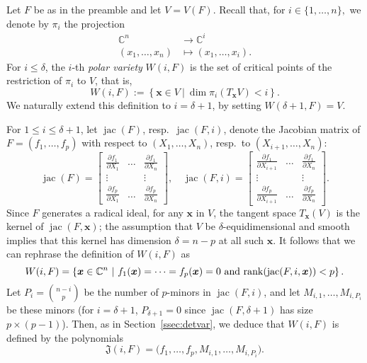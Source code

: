 \documentclass[12pt]{article}
\def\frkJ{\mathfrak{J}}
\def\xb{{\bm x}}
\DeclareMathOperator{\jac}{jac}
\def\pa{\partial}
\def\C{\mathbb{C}}
\newtheorem{lemma}[theorem]{Lemma}
\begin{document}
Let $F$ be as in the preamble and let $V=V(F)$. Recall that, for $i
\in \{1,\hdots,n\},$ we denote by $\pi_i$ the projection
\begin{align*}
  \C^n &\rightarrow \C^i \\
  (x_1,\hdots,x_n) &\mapsto  (x_1,\hdots,x_i).    
\end{align*} 
For $i \le \delta$, the $i$-th \textit{polar variety} $W(i,F)$  is
the set of critical points of the restriction of $\pi_i$ to $V$, that
is,
\[W(i,F) := \left\{\xb \in V~|~\dim \pi_i(T_\xb V) < i\right\}.\]
We naturally extend this definition to $i=\delta+1$, by setting
$W({\delta+1},F)=V$.

For $1\le i \le \delta+1$, let $\jac(F)$, resp.\ $\jac(F, i)$, denote the
Jacobian matrix of $F=(f_1,\hdots,f_p)$ with respect to
$(X_{1},\hdots,X_n)$, resp.\ to $(X_{i+1},\hdots,X_n):$
\[
\jac(F)=
\left[ 
\begin{array}{ccc}
\frac{\pa f_1}{\pa X_{1}}&\hdots& \frac{\pa f_1}{\pa X_{n}} \\
\vdots& &\vdots\\
\frac{\pa f_p}{\pa X_{1}}&\hdots& \frac{\pa f_p}{\pa X_{n}} 
\end{array}
\right ],
\quad
\jac(F, i)=
\left[ 
\begin{array}{ccc}
\frac{\pa f_1}{\pa X_{i+1}}&\hdots& \frac{\pa f_1}{\pa X_{n}} \\
\vdots& &\vdots\\
\frac{\pa f_p}{\pa X_{i+1}}&\hdots& \frac{\pa f_p}{\pa X_{n}} 
\end{array}
\right]. 
\]
Since $F$ generates a radical ideal, for any $\xb$ in $V$, the tangent
space $T_\xb(V)$ is the kernel of $\jac(F,\xb)$; the assumption that
$V$ be $\delta$-equidimensional and smooth implies that this kernel
has dimension $\delta=n-p$ at all such $\xb$. It follows that 
we can rephrase the definition of $W(i,F)$ as
\[W(i,F) = \left\{\xb \in \C^n~|~ f_1(\xb)=\cdots=f_p(\xb)=0 
\text{~and~} {\rm rank}(\jac(F,i,\xb)) < p\right\}.\] Let $P_i
=\binom{n-i}{p}$ be the number of $p$-minors in $\jac(F,i)$, and let
$M_{i,1},\hdots,M_{i,P_i}$ be these minors (for $i=\delta+1$,
$P_{\delta+1}=0$ since $\jac(F,{\delta+1})$ has size $p \times
(p-1)$). Then, as in Section~\ref{ssec:detvar}, we deduce that
$W(i,F)$ is defined by the polynomials
\begin{equation}\label{eq:frkJ}
\frkJ(i,F) = \big(f_1,\hdots,f_p,M_{i,1},\hdots,M_{i,P_{i}}\big).  
\end{equation}
\end{document}
